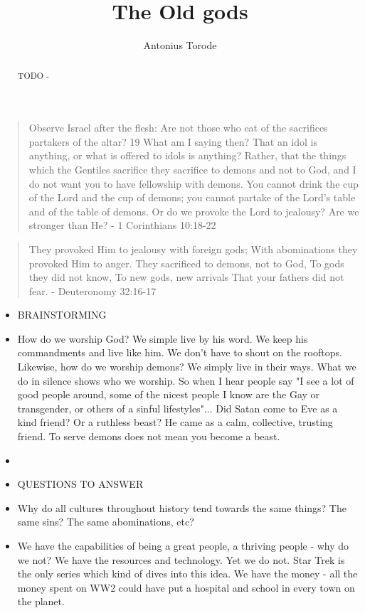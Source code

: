 \documentclass[10pt]{article}
\title{The Old gods}
\author{Antonius Torode}
\begin{document}
\maketitle
\thispagestyle{fancy}


\begin{abstract}
TODO - \lipsum[0-1]
\end{abstract}

\begin{multicols}{2}

\begin{quotation}
Observe Israel after the flesh: Are not those who eat of the sacrifices partakers of the altar? 19 What am I saying then? That an idol is anything, or what is offered to idols is anything? Rather, that the things which the Gentiles sacrifice they sacrifice to demons and not to God, and I do not want you to have fellowship with demons. You cannot drink the cup of the Lord and the cup of demons; you cannot partake of the Lord’s table and of the table of demons. Or do we provoke the Lord to jealousy? Are we stronger than He? - 1 Corinthians 10:18-22
\end{quotation}

\begin{quotation}
They provoked Him to jealousy with foreign gods;
With abominations they provoked Him to anger.
They sacrificed to demons, not to God,
To gods they did not know,
To new gods, new arrivals
That your fathers did not fear. - Deuteronomy 32:16-17
\end{quotation}


\begin{itemize}
\item BRAINSTORMING
\item How do we worship God? We simple live by his word. We keep his commandments and live like him. We don't have to shout on the rooftops. Likewise, how do we worship demons? We simply live in their ways. What we do in silence shows who we worship. So when I hear people say "I see a lot of good people around, some of the nicest people I know are the Gay or transgender, or others of a sinful lifestyles"... Did Satan come to Eve as a kind friend? Or a ruthless beast? He came as a calm, collective, trusting friend. To serve demons does not mean you become a beast.
\item
\end{itemize}

\begin{itemize}
\item QUESTIONS TO ANSWER
\item Why do all cultures throughout history tend towards the same things? The same sins? The same abominations, etc?
\item We have the capabilities of being a great people, a thriving people - why do we not? We have the resources and technology. Yet we do not. Star Trek is the only series which kind of dives into this idea. We have the money - all the money spent on WW2 could have put a hospital and school in every town on the planet.
\end{itemize}



\end{multicols}
\end{document}
